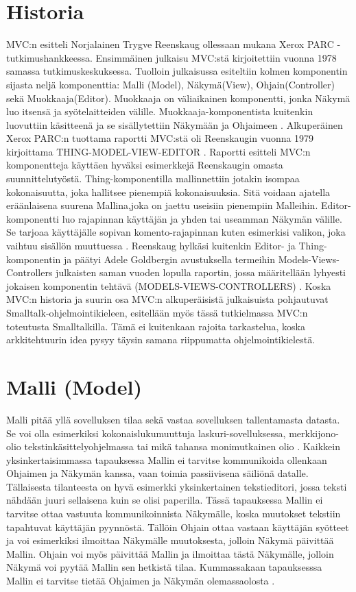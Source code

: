 \documentclass[utf8]{gradu3}
\begin{document}
\section{Historia}
MVC:n esitteli Norjalainen Trygve Reenskaug ollessaan mukana Xerox PARC -tutkimushankkeessa. 
Ensimmäinen julkaisu MVC:stä kirjoitettiin vuonna 1978 samassa tutkimuskeskuksessa. 
Tuolloin julkaisussa esiteltiin kolmen komponentin sijasta neljä komponenttia: 
Malli (Model), Näkymä(View), Ohjain(Controller) sekä Muokkaaja(Editor). Muokkaaja on 
väliaikainen komponentti, jonka Näkymä luo itsensä ja syötelaitteiden välille. 
Muokkaaja-komponentista kuitenkin luovuttiin käsitteenä ja se sisällytettiin Näkymään 
ja Ohjaimeen \parencite{xerox}. Alkuperäinen Xerox PARC:n tuottama raportti MVC:stä oli Reenskaugin 
vuonna 1979 kirjoittama THING-MODEL-VIEW-EDITOR \parencite{xerox-thing}. Raportti esitteli MVC:n 
komponentteja käyttäen hyväksi esimerkkejä Reenskaugin omasta suunnittelutyöstä. Thing-komponentilla mallinnettiin
jotakin isompaa kokonaisuutta, joka hallitsee pienempiä kokonaisuuksia. Sitä voidaan ajatella eräänlaisena suurena Mallina,joka on jaettu useisiin pienempiin Malleihin. Editor-komponentti luo rajapinnan käyttäjän ja yhden tai useamman Näkymän välille. Se tarjoaa käyttäjälle sopivan komento-rajapinnan kuten esimerkisi valikon, joka vaihtuu sisällön muuttuessa \parencite{xerox-thing}. Reenskaug hylkäsi kuitenkin Editor- ja Thing-komponentin ja  päätyi Adele Goldbergin avustuksella termeihin Models-Views-Controllers julkaisten saman vuoden lopulla raportin, jossa määritellään lyhyesti jokaisen komponentin tehtävä (MODELS-VIEWS-CONTROLLERS) \parencite{xerox-original}. Koska MVC:n historia ja suurin osa MVC:n alkuperäisistä julkaisuista pohjautuvat Smalltalk-ohjelmointikieleen, esitellään myös tässä tutkielmassa MVC:n toteutusta Smalltalkilla.
Tämä ei kuitenkaan rajoita tarkastelua, koska arkkitehtuurin idea pysyy täysin samana riippumatta ohjelmointikielestä.

\section{Malli (Model)}
Malli pitää yllä sovelluksen tilaa sekä vastaa sovelluksen tallentamasta datasta. Se voi olla esimerkiksi kokonaislukumuuttuja laskuri-sovelluksessa, merkkijono-olio tekstinkäsittelyohjelmassa tai
mikä tahansa monimutkainen olio \parencite[s. 3]{krasner_desc}. Kaikkein yksinkertaisimmassa tapauksessa Mallin ei tarvitse kommunikoida ollenkaan Ohjaimen ja Näkymän kanssa, vaan toimia passiivisena säiliönä datalle.
Tällaisesta tilanteesta on hyvä esimerkki yksinkertainen tekstieditori, jossa teksti nähdään juuri sellaisena kuin se olisi paperilla. Tässä tapauksessa Mallin ei tarvitse ottaa vastuuta
kommunikoinnista Näkymälle, koska muutokset tekstiin tapahtuvat käyttäjän pyynnöstä. Tällöin Ohjain ottaa vastaan käyttäjän syötteet ja voi esimerkiksi ilmoittaa Näkymälle muutoksesta, jolloin Näkymä
päivittää Mallin. Ohjain voi myös päivittää Mallin ja ilmoittaa tästä Näkymälle, jolloin Näkymä voi pyytää Mallin sen hetkistä tilaa. Kummassakaan tapauksesssa Mallin ei tarvitse tietää Ohjaimen ja Näkymän
olemassaolosta \parencite{burbeck}.
\end{document}
